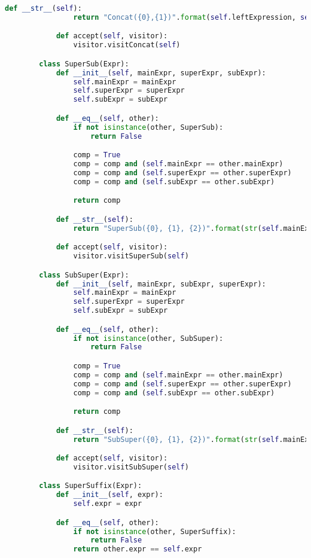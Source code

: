 \begin{lstlisting}[language=Python]
            def __str__(self):
                return "Concat({0},{1})".format(self.leftExpression, self.rightExpression)

            def accept(self, visitor):
                visitor.visitConcat(self)

        class SuperSub(Expr):
            def __init__(self, mainExpr, superExpr, subExpr):
                self.mainExpr = mainExpr
                self.superExpr = superExpr
                self.subExpr = subExpr

            def __eq__(self, other):
                if not isinstance(other, SuperSub):
                    return False

                comp = True
                comp = comp and (self.mainExpr == other.mainExpr)
                comp = comp and (self.superExpr == other.superExpr)
                comp = comp and (self.subExpr == other.subExpr)

                return comp

            def __str__(self):
                return "SuperSub({0}, {1}, {2})".format(str(self.mainExpr), str(self.superExpr), str(self.subExpr))

            def accept(self, visitor):
                visitor.visitSuperSub(self)

        class SubSuper(Expr):
            def __init__(self, mainExpr, subExpr, superExpr):
                self.mainExpr = mainExpr
                self.superExpr = superExpr
                self.subExpr = subExpr

            def __eq__(self, other):
                if not isinstance(other, SubSuper):
                    return False

                comp = True
                comp = comp and (self.mainExpr == other.mainExpr)
                comp = comp and (self.superExpr == other.superExpr)
                comp = comp and (self.subExpr == other.subExpr)

                return comp

            def __str__(self):
                return "SubSuper({0}, {1}, {2})".format(str(self.mainExpr), str(self.superExpr), str(self.subExpr))

            def accept(self, visitor):
                visitor.visitSubSuper(self)

        class SuperSuffix(Expr):
            def __init__(self, expr):
                self.expr = expr

            def __eq__(self, other):
                if not isinstance(other, SuperSuffix):
                    return False
                return other.expr == self.expr


\end{lstlisting}
